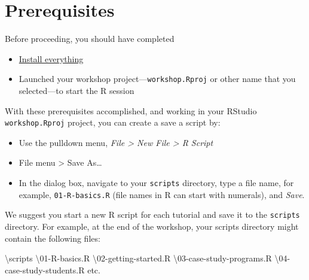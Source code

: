 \documentclass[
]{book}
\newenvironment{Shaded}{\begin{snugshade}}{\end{snugshade}}
\newcommand{\DecValTok}[1]{\textcolor[rgb]{0.00,0.00,0.81}{#1}}
\newcommand{\NormalTok}[1]{#1}
\newcommand{\SpecialCharTok}[1]{\textcolor[rgb]{0.00,0.00,0.00}{#1}}
\providecommand{\tightlist}{%
  \setlength{\itemsep}{0pt}\setlength{\parskip}{0pt}}
\begin{document}
\hypertarget{prerequisites}{%
\section{Prerequisites}\label{prerequisites}}

Before proceeding, you should have completed

\begin{itemize}
\tightlist
\item
  \protect\hyperlink{install-everything}{Install everything}\\
\item
  Launched your workshop project---\texttt{workshop.Rproj} or other name that you selected---to start the R session
\end{itemize}

With these prerequisites accomplished, and working in your RStudio \texttt{workshop.Rproj} project, you can create a save a script by:

\begin{itemize}
\tightlist
\item
  Use the pulldown menu, \emph{File \textgreater{} New File \textgreater{} R Script}
\item
  File menu \textgreater{} Save As\ldots{}
\item
  In the dialog box, navigate to your \texttt{scripts} directory, type a file name, for example, \texttt{01-R-basics.R} (file names in R can start with numerals), and \emph{Save}.
\end{itemize}

We suggest you start a new R script for each tutorial and save it to the \texttt{scripts} directory. For example, at the end of the workshop, your scripts directory might contain the following files:

\begin{Shaded}
\begin{Highlighting}[]
\NormalTok{        \textbackslash{}scripts    }
\NormalTok{            \textbackslash{}}\DecValTok{01}\SpecialCharTok{{-}}\NormalTok{R}\SpecialCharTok{{-}}\NormalTok{basics.R    }
\NormalTok{            \textbackslash{}}\DecValTok{02}\SpecialCharTok{{-}}\NormalTok{getting}\SpecialCharTok{{-}}\NormalTok{started.R    }
\NormalTok{            \textbackslash{}}\DecValTok{03}\SpecialCharTok{{-}}\NormalTok{case}\SpecialCharTok{{-}}\NormalTok{study}\SpecialCharTok{{-}}\NormalTok{programs.R    }
\NormalTok{            \textbackslash{}}\DecValTok{04}\SpecialCharTok{{-}}\NormalTok{case}\SpecialCharTok{{-}}\NormalTok{study}\SpecialCharTok{{-}}\NormalTok{students.R     }
\NormalTok{            etc.  }
\end{Highlighting}
\end{Shaded}
\end{document}
